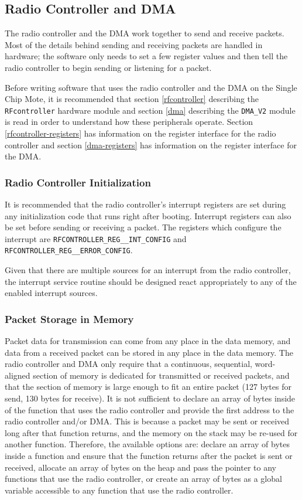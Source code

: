 \subsection{Radio Controller and DMA} \label{radio-controller-sw}
The radio controller and the DMA work together to send and receive packets. Most of the details behind sending and receiving packets are handled in hardware; the software only needs to set a few register values and then tell the radio controller to begin sending or listening for a packet.

Before writing software that uses the radio controller and the DMA on the Single Chip Mote, it is recommended that section \ref{rfcontroller} describing the \texttt{RFcontroller} hardware module and section \ref{dma} describing the \texttt{DMA\_V2} module is read in order to understand how these peripherals operate. Section \ref{rfcontroller-registers} has information on the register interface for the radio controller and section \ref{dma-registers} has information on the register interface for the DMA.

\subsubsection{Radio Controller Initialization}
It is recommended that the radio controller's interrupt registers are set during any initialization code that runs right after booting. Interrupt registers can also be set before sending or receiving a packet. The registers which configure the interrupt are \texttt{RFCONTROLLER\_REG\_\_INT\_CONFIG} and \texttt{RFCONTROLLER\_REG\_\_ERROR\_CONFIG}.

Given that there are multiple sources for an interrupt from the radio controller, the interrupt service routine should be designed react appropriately to any of the enabled interrupt sources.

\subsubsection{Packet Storage in Memory}
Packet data for transmission can come from any place in the data memory, and data from a received packet can be stored in any place in the data memory. The radio controller and DMA only require that a continuous, sequential, word-aligned section of memory is dedicated for transmitted or received packets, and that the section of memory is large enough to fit an entire packet (127 bytes for send, 130 bytes for receive). It is not sufficient to declare an array of bytes inside of the function that uses the radio controller and provide the first address to the radio controller and/or DMA. This is because a packet may be sent or received long after that function returns, and the memory on the stack may be re-used for another function. Therefore, the available options are: declare an array of bytes inside a function and ensure that the function returns after the packet is sent or received, allocate an array of bytes on the heap and pass the pointer to any functions that use the radio controller, or create an array of bytes as a global variable accessible to any function that use the radio controller.

